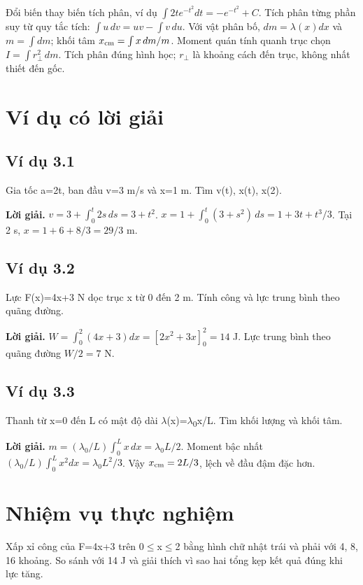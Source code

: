 \documentclass[11pt,a4paper,openany]{book}
\begin{document}
Đổi biến thay biến tích phân, ví dụ $\int 2t e^{-t^2}dt=-e^{-t^2}+C$. Tích phân từng phần suy từ quy tắc tích: $\int u\,dv=uv-\int v\,du$. Với vật phân bố, $dm=\lambda(x)dx$ và $m=\int dm$; khối tâm $x_{\rm cm}=\int x\,dm/m$. Moment quán tính quanh trục chọn $I=\int r_\perp^2\,dm$. Tích phân đúng hình học; $r_\perp$ là khoảng cách đến trục, không nhất thiết đến gốc.
\begin{center}
\end{center}
\section{Ví dụ có lời giải}
\subsection*{Ví dụ 3.1}
Gia tốc a=2t, ban đầu v=3 m/s và x=1 m. Tìm v(t), x(t), x(2).

\textbf{Lời giải.} $v=3+\int_0^t2s\,ds=3+t^2$. $x=1+\int_0^t(3+s^2)\,ds=1+3t+t^3/3$. Tại 2 s, $x=1+6+8/3=29/3$ m.
\subsection*{Ví dụ 3.2}
Lực F(x)=4x+3 N dọc trục x từ 0 đến 2 m. Tính công và lực trung bình theo quãng đường.

\textbf{Lời giải.} $W=\int_0^2(4x+3)dx=[2x^2+3x]_0^2=14$ J. Lực trung bình theo quãng đường $W/2=7$ N.
\subsection*{Ví dụ 3.3}
Thanh từ x=0 đến L có mật độ dài \ensuremath{\lambda}(x)=\ensuremath{\lambda}\textsubscript{0}x/L. Tìm khối lượng và khối tâm.

\textbf{Lời giải.} $m=(\lambda_0/L)\int_0^L x\,dx=\lambda_0L/2$. Moment bậc nhất $(\lambda_0/L)\int_0^Lx^2dx=\lambda_0L^2/3$. Vậy $x_{\rm cm}=2L/3$, lệch về đầu đậm đặc hơn.
\section{Nhiệm vụ thực nghiệm}
Xấp xỉ công của F=4x+3 trên 0\ensuremath{\le}x\ensuremath{\le}2 bằng hình chữ nhật trái và phải với 4, 8, 16 khoảng. So sánh với 14 J và giải thích vì sao hai tổng kẹp kết quả đúng khi lực tăng.
\end{document}
